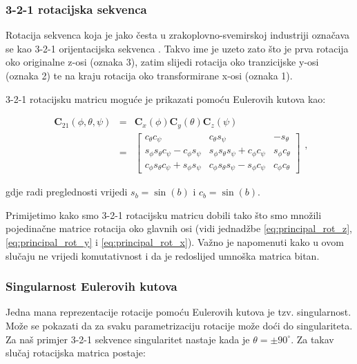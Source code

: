 \documentclass[times, utf8, diplomski, numeric]{templates/template}
\begin{document}
{{{            \subsubsection{3-2-1 rotacijska sekvenca}{
                Rotacija sekvenca koja je jako česta u zrakoplovno-svemirskoj industriji označava se kao 3-2-1 orijentacijska sekvenca . Takvo ime je uzeto zato što je prva rotacija oko originalne z-osi (oznaka 3), zatim slijedi rotacija oko tranzicijske y-osi (oznaka 2) te na kraju rotacija oko transformirane x-osi (oznaka 1).

                3-2-1 rotacijsku matricu moguće je prikazati pomoću Eulerovih kutova kao:

                \begin{equation}
                \label{eq:euler_rot_mat}
                \begin{array}{rcl}
                \boldsymbol{C}_{21}(\phi, \theta, \psi) & = & \boldsymbol{C}_{x}(\phi) \boldsymbol{C}_{y}(\theta) \boldsymbol{C}_{z}(\psi) \\
                & = &
                \begin{bmatrix}
                    c_{\theta}c_{\psi}                            & c_{\theta}s_{\psi}                            & -s_{\theta} \\
                    s_{\phi}s_{\theta}c_{\psi} - c_{\phi}s_{\psi} & s_{\phi}s_{\theta}s_{\psi} + c_{\phi}c_{\psi} & s_{\phi}c_{\theta} \\
                    c_{\phi}s_{\theta}c_{\psi} + s_{\phi}s_{\psi} & c_{\phi}s_{\theta}s_{\psi} - s_{\phi}c_{\psi} & c_{\phi}c_{\theta}
                \end{bmatrix}
                \end{array}
                ,
                \end{equation}

                gdje radi preglednosti vrijedi $s_{b}=\sin(b)$ i $c_{b}=\sin(b)$.

                Primijetimo kako smo 3-2-1 rotacijsku matricu dobili tako što smo množili pojedinačne matrice rotacija oko glavnih osi (vidi jednadžbe \ref{eq:principal_rot_z}, \ref{eq:principal_rot_y} i \ref{eq:principal_rot_x}). Važno je napomenuti kako u ovom slučaju ne vrijedi komutativnost i da je redoslijed umnoška matrica bitan.
            }

            \subsubsection{Singularnost Eulerovih kutova}{
            \label{subsubsection:singularnost_eulerovih_kutova}
                Jedna mana reprezentacije rotacije pomoću Eulerovih kutova je tzv. singularnost. Može se pokazati da za svaku parametrizaciju rotacije može doći do singulariteta. Za naš primjer 3-2-1 sekvence singularitet nastaje kada je $\theta=\pm90^{\circ}$. Za takav slučaj rotacijska matrica postaje:

}}}}
\end{document}
